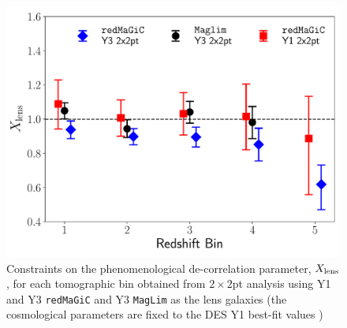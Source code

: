 \documentclass[aps, prd,twocolumn,superscriptaddress,nofootinbib,preprintnumbers]{revtex4-1}
\newcommand{\gammat}{\ensuremath{\gamma_{\rm t}(\theta)}}
\newcommand{\wtheta}{\ensuremath{w(\theta)}}
\newcommand{\redmagic}{\texttt{redMaGiC} }
\newcommand{\maglim}{\texttt{MagLim} }
\newcommand{\IR}[1]{{\color{red}[\textbf{Note for IR}: #1]}}
\begin{document}




\begin{figure}
\includegraphics[width=\columnwidth]{figs/xlens_comp.pdf}
\caption[]{Constraints on the phenomenological de-correlation parameter, $X_{\rm lens}$, for each tomographic bin obtained from $2\times 2$pt analysis using Y1 and Y3 \redmagic and Y3 \maglim as the lens galaxies (the cosmological parameters are fixed to the DES Y1 best-fit values \citep{Abbott_2018})}
\label{fig:Xlens_5X_y1y3}
\end{figure}
\end{document}
